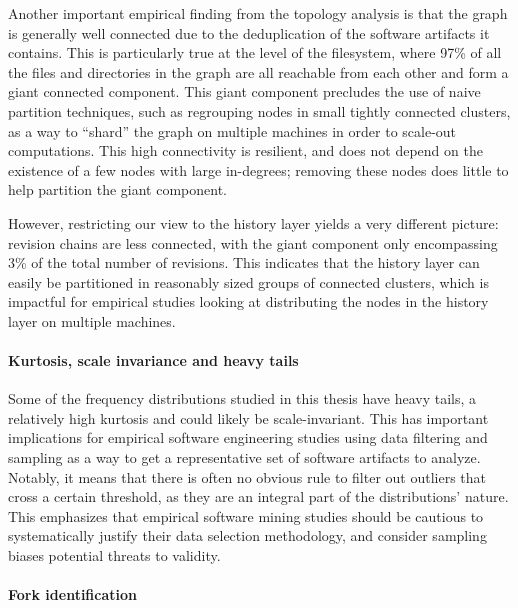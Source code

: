 Another important empirical finding from the topology analysis is that the
graph is generally well connected due to the deduplication of the software
artifacts it contains. This is particularly true at the level of the
filesystem, where 97\% of all the files and directories in the graph are all
reachable from each other and form a giant connected component. This giant
component precludes the use of naive partition techniques, such as regrouping
nodes in small tightly connected clusters, as a way to ``shard'' the graph on
multiple machines in order to scale-out computations. This high connectivity is
resilient, and does not depend on the existence of a few nodes with large
in-degrees; removing these nodes does little to help partition the giant
component.

However, restricting our view to the history layer yields a very different
picture: revision chains are less connected, with the giant component only
encompassing 3\% of the total number of revisions. This indicates that the
history layer can easily be partitioned in reasonably sized groups of connected
clusters, which is impactful for empirical studies looking at distributing the
nodes in the history layer on multiple machines.

\paragraph*{Kurtosis, scale invariance and heavy tails}

Some of the frequency distributions studied in this thesis have heavy tails,
a relatively high kurtosis and could likely be scale-invariant. This has
important implications for empirical software engineering studies using data
filtering and sampling as a way to get a representative set of software
artifacts to analyze. Notably, it means that there is often no obvious rule to
filter out outliers that cross a certain threshold, as they are an integral
part of the distributions' nature. This emphasizes that empirical software
mining studies should be cautious to systematically justify their data
selection methodology, and consider sampling biases potential threats to
validity.

\paragraph*{Fork identification}

